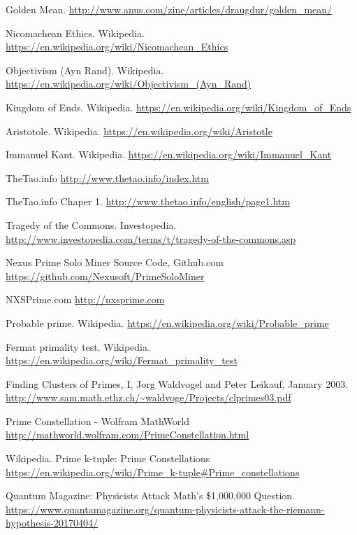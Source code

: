 \documentclass[11pt]{article}
\begin{document}
\begin{thebibliography}{7}
Golden Mean.
\url{http://www.anus.com/zine/articles/draugdur/golden_mean/}

Nicomachean Ethics. Wikipedia.
\url{https://en.wikipedia.org/wiki/Nicomachean_Ethics}

Objectivism (Ayn Rand). Wikipedia.
\url{https://en.wikipedia.org/wiki/Objectivism_(Ayn_Rand)}

Kingdom of Ends. Wikipedia.
\url{https://en.wikipedia.org/wiki/Kingdom_of_Ends}

Aristotole. Wikipedia.
\url{https://en.wikipedia.org/wiki/Aristotle}

Immanuel Kant. Wikipedia.
\url{https://en.wikipedia.org/wiki/Immanuel_Kant}

TheTao.info
\url{http://www.thetao.info/index.htm}

TheTao.info Chaper 1.
\url{http://www.thetao.info/english/page1.htm}

Tragedy of the Commons. Investopedia.
\url{http://www.investopedia.com/terms/t/tragedy-of-the-commons.asp}

Nexus Prime Solo Miner Source Code, Github.com
\url{https://github.com/Nexusoft/PrimeSoloMiner}

NXSPrime.com
\url{http://nxsprime.com}

Probable prime. Wikipedia.
\url{https://en.wikipedia.org/wiki/Probable_prime}

Fermat primality test. Wikipedia.
\url{https://en.wikipedia.org/wiki/Fermat_primality_test}

Finding Clusters of Primes, I, Jorg Waldvogel and Peter Leikauf, January 2003.
\url{http://www.sam.math.ethz.ch/~waldvoge/Projects/clprimes03.pdf}

Prime Constellation - Wolfram MathWorld
\url{http://mathworld.wolfram.com/PrimeConstellation.html}

Wikipedia. Prime k-tuple: Prime Constellations
\url{https://en.wikipedia.org/wiki/Prime_k-tuple#Prime_constellations}

Quantum Magazine: Physicists Attack Math's \$1,000,000 Question.
\url{https://www.quantamagazine.org/quantum-physicists-attack-the-riemann-hypothesis-20170404/}


\end{thebibliography}
\end{document}

